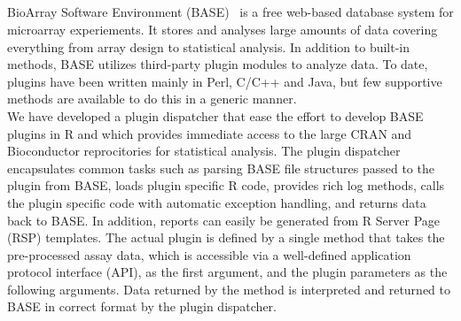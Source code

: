 \documentclass[portrait,plainsections]{sciposter}
\title{\docTitle}
\author{\docAuthors}
\institute{\docAddressI\\\docAddressII}
\newlength{\dblcolwidth}
\begin{document}

\maketitle

\begin{multicols}{3}                                        %

\setlength{\dblcolwidth}{2\columnwidth}
\addtolength{\dblcolwidth}{\columnsep}

\begin{minipage}{\columnwidth}
\section*{{\color{lublue}{Abstract}}}
 BioArray Software Environment (BASE)~\cite{SaalL_etal_2002} is a free  web-based database system for microarray experiements.  It stores and analyses large amounts of data covering everything from array design to statistical analysis.  In addition to built-in methods, BASE utilizes third-party plugin modules to analyze data.  To date, plugins have been written mainly in Perl, C/C++ and Java, but few supportive methods are available to do this in a generic manner.\\

We have developed a plugin dispatcher that ease the effort to develop BASE plugins in R and which provides immediate access to the large CRAN and Bioconductor reprocitories for statistical analysis.  The plugin dispatcher encapsulates common tasks such as parsing BASE file structures passed to the plugin from BASE, loads plugin specific R code, provides rich log methods, calls the plugin specific code with automatic exception handling, and returns data back to BASE.  In addition, reports can easily be generated from R Server Page (RSP) templates.  The actual plugin is defined by a single method that takes the pre-processed assay data, which is accessible via a well-defined application protocol interface (API), as the first argument, and the plugin parameters as the following arguments.  Data returned by the method is interpreted and returned to BASE in correct format by the plugin dispatcher.\\


\end{minipage}
\end{multicols}
\end{document}
